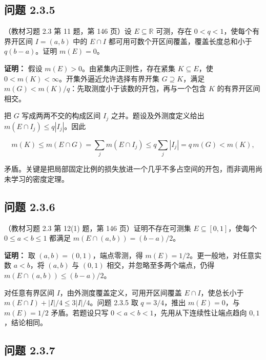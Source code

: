 \documentclass[11pt,a4paper]{article}
\begin{document}
\subsection{问题 2.3.5}\label{ux95eeux9898-2.3.5}

（教材习题 2.3 第 11 题，第 146 页）设 \(E\subseteq\mathbb R\)
可测，存在 \(0<q<1\)，使每个有界开区间 \(I=(a,b)\) 中的 \(E\cap I\)
都可用可数个开区间覆盖，覆盖长度总和小于 \(q(b-a)\)。证明 \(m(E)=0\)。

\textbf{证明：} 假设 \(m(E)>0\)。由紧集内正则性，存在紧集
\(K\subseteq E\)，使 \(0<m(K)<\infty\)。开集外逼近允许选择有界开集
\(G\supseteq K\)，满足
\(m(G)<m(K)/q\)：先取测度小于该数的开包，再与一个包含 \(K\)
的有界开区间相交。

把 \(G\) 写成两两不交的构成区间 \(I_j\) 之并。题设及外测度定义给出
\(m(E\cap I_j)\le q|I_j|\)。因此

\begin{equation*}
m(K)\le m(E\cap G)=\sum_jm(E\cap I_j)
\le q\sum_j|I_j|=q\,m(G)<m(K),
\tag{2.3.19}
\end{equation*}

矛盾。关键是把局部固定比例的损失放进一个几乎不多占空间的开包，而非调用尚未学习的密度定理。

\subsection{问题 2.3.6}\label{ux95eeux9898-2.3.6}

（教材习题 2.3 第 12(1) 题，第 146 页）证明不存在可测集
\(E\subseteq[0,1]\)，使每个 \(0\le a<b\le1\) 都满足
\(m(E\cap(a,b))=(b-a)/2\)。

\textbf{证明：} 取 \((a,b)=(0,1)\)，端点零测，得
\(m(E)=1/2\)。更一般地，对任意实数 \(a<b\)，将 \((a,b)\) 与 \((0,1)\)
相交，并忽略至多两个端点，仍得 \(m(E\cap(a,b))\le(b-a)/2\)。

对任意有界区间 \(I\)，由外测度覆盖定义，可用开区间覆盖
\(E\cap I\)，使总长小于 \(m(E\cap I)+|I|/4\le3|I|/4\)。问题 2.3.5 取
\(q=3/4\)，推出 \(m(E)=0\)，与 \(m(E)=1/2\) 矛盾。若题设只写
\(0<a<b<1\)，先用从下连续性让端点趋向 \(0,1\)，结论相同。

\subsection{问题 2.3.7}\label{ux95eeux9898-2.3.7}
\end{document}
